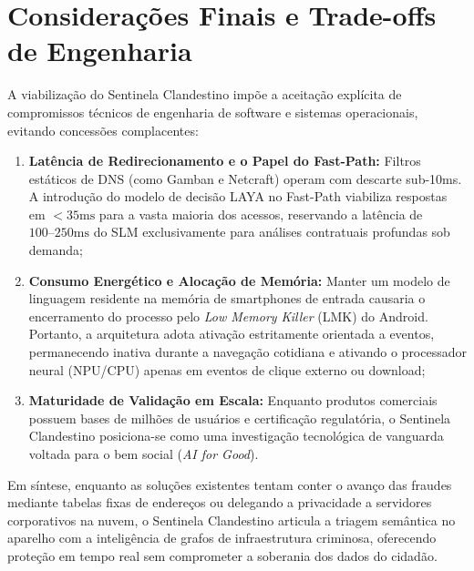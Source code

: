\section{Considera\c{c}\~{o}es Finais e Trade-offs de Engenharia}
\label{sec:conclusao}

A viabiliza\c{c}\~{a}o do Sentinela Clandestino imp\~{o}e a aceita\c{c}\~{a}o expl\'{i}cita de compromissos t\'{e}cnicos de engenharia de software e sistemas operacionais, evitando concess\~{o}es complacentes:

\begin{enumerate}
    \item \textbf{Lat\^{e}ncia de Redirecionamento e o Papel do Fast-Path:} Filtros est\'{a}ticos de DNS (como Gamban e Netcraft) operam com descarte sub-10ms. A introdu\c{c}\~{a}o do modelo de decis\~{a}o LAYA no Fast-Path viabiliza respostas em $< 35\text{ms}$ para a vasta maioria dos acessos, reservando a lat\^{e}ncia de $100\text{--}250\text{ms}$ do SLM exclusivamente para an\'{a}lises contratuais profundas sob demanda;
    \item \textbf{Consumo Energ\'{e}tico e Aloca\c{c}\~{a}o de Mem\'{o}ria:} Manter um modelo de linguagem residente na mem\'{o}ria de smartphones de entrada causaria o encerramento do processo pelo \textit{Low Memory Killer} (LMK) do Android. Portanto, a arquitetura adota ativa\c{c}\~{a}o estritamente orientada a eventos, permanecendo inativa durante a navega\c{c}\~{a}o cotidiana e ativando o processador neural (NPU/CPU) apenas em eventos de clique externo ou download;
    \item \textbf{Maturidade de Valida\c{c}\~{a}o em Escala:} Enquanto produtos comerciais possuem bases de milh\~{o}es de usu\'{a}rios e certifica\c{c}\~{a}o regulat\'{o}ria, o Sentinela Clandestino posiciona-se como uma investiga\c{c}\~{a}o tecnol\'{o}gica de vanguarda voltada para o bem social (\textit{AI for Good}).
\end{enumerate}

Em s\'{i}ntese, enquanto as solu\c{c}\~{o}es existentes tentam conter o avan\c{c}o das fraudes mediante tabelas fixas de endere\c{c}os ou delegando a privacidade a servidores corporativos na nuvem, o Sentinela Clandestino articula a triagem sem\^{a}ntica no aparelho com a intelig\^{e}ncia de grafos de infraestrutura criminosa, oferecendo prote\c{c}\~{a}o em tempo real sem comprometer a soberania dos dados do cidad\~{a}o.
